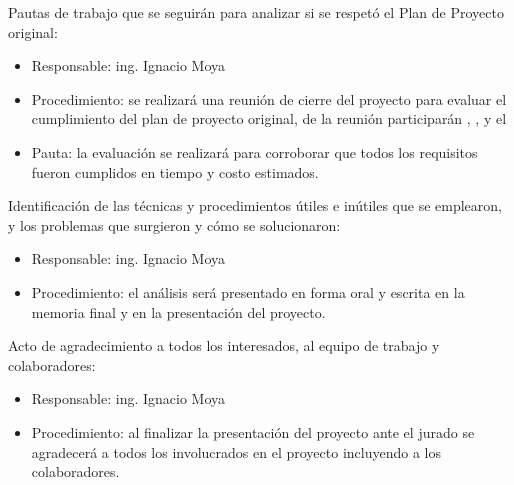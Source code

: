 \documentclass[11pt]{charter}
\begin{document}
Pautas de trabajo que se seguirán para analizar si se respetó el Plan de Proyecto original:
\begin{itemize}
\item Responsable: ing. Ignacio Moya
\item Procedimiento: se realizará una reunión de cierre del proyecto para evaluar el cumplimiento del plan de proyecto original, de la reunión participarán \clientename, \supname,  y el \authorname
\item Pauta: la evaluación se realizará para corroborar que todos los requisitos fueron cumplidos en tiempo y costo estimados.
\end{itemize}
Identificación de las técnicas y procedimientos útiles e inútiles que se emplearon, y los problemas que surgieron y cómo se solucionaron:
\begin{itemize}
\item Responsable: ing. Ignacio Moya
\item Procedimiento: el análisis será presentado en forma oral y escrita en la memoria final y en la presentación del proyecto.
\end{itemize}
Acto de agradecimiento a todos los interesados, al equipo de trabajo y colaboradores:
\begin{itemize}
\item Responsable: ing. Ignacio Moya
\item Procedimiento: al finalizar la presentación del proyecto ante el jurado se agradecerá a todos los involucrados en el proyecto incluyendo a los colaboradores.
\end{itemize}
\end{document}
